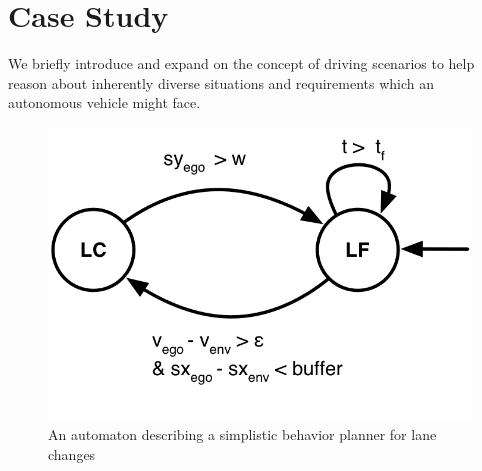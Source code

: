 \section{Case Study}
\label{sec:case studies}
We briefly introduce and expand on the concept of driving scenarios to help reason about inherently diverse situations and requirements which an autonomous vehicle might face. 
\begin{figure}[t]
	\centering
	\includegraphics[scale=.6]{figures/behavior_planner}
	\caption{An automaton describing a simplistic behavior planner for lane changes}
	\vspace{-10pt}
	\label{fig:beh planner}
\end{figure}
